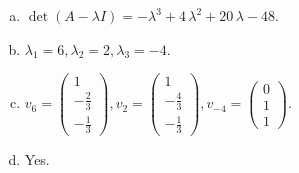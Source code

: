 \begin{questions}
\begin{solution}
\begin{enumerate}[(a)]
\item $\det(A-\lambda I)=-{\lambda}^{3} + 4 \, {\lambda}^{2} + 20 \, {\lambda} - 48$.
\item ${\lambda}_1=6, {\lambda}_2=2, {\lambda}_3=-4$.
\item $v_{6}=\left(\begin{array}{r}
1 \\
-\frac{2}{3} \\
-\frac{1}{3}
\end{array}\right), v_{2}=\left(\begin{array}{r}
1 \\
-\frac{4}{3} \\
-\frac{1}{3}
\end{array}\right), v_{-4}=\left(\begin{array}{r}
0 \\
1 \\
1
\end{array}\right)$.
\item Yes.
\end{enumerate}
\end{solution}

\end{questions}

\newpage


\begin{center}
\end{center}

